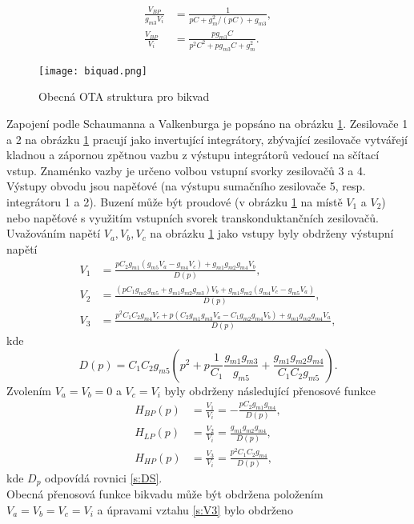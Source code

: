 \begin{align}
\frac{V_{BP}}{g_{m3}V_i} &= \frac{1}{pC + g_m^2/(pC) + g_{m3}},\\
\frac{V_{BP}}{V_i} &= \frac{pg_{m3}C}{p^2C^2 + pg_{m3}C + g_m^2}.
\end{align}
\begin{figure}[h]
\centering
\texttt{[image: biquad.png]}
\caption[Obecná OTA struktura pro bikvad]{Obecná OTA struktura pro bikvad \label{s:BIK}}
\end{figure}
\noindent Zapojení podle Schaumanna a Valkenburga \cite{13} je popsáno na obrázku \ref{s:BIK}. Zesilovače 1 a 2 na obrázku \ref{s:BIK} pracují jako invertující integrátory, zbývající zesilovače vytvářejí kladnou a zápornou zpětnou vazbu z výstupu integrátorů vedoucí na sčítací vstup. Znaménko vazby je určeno volbou vstupní svorky zesilovačů 3 a 4. Výstupy obvodu jsou napěťové (na výstupu sumačního zesilovače 5, resp. integrátoru 1 a 2). Buzení může být proudové (v obrázku \ref{s:BIK} na místě $V_1$ a $V_2$) nebo napěťové s využitím vstupních svorek transkonduktančních zesilovačů. Uvažováním napětí $V_a, V_b, V_c$ na obrázku \ref{s:BIK} jako vstupy byly obdrženy výstupní napětí
\begin{align}
V_1 &= \frac{pC_2g_{m1}(g_{m5}V_a - g_{m4}V_c) + g_{m1}g_{m2}g_{m4}V_b}{D(p)},\\
V_2 &= \frac{(pC_1g_{m2}g_{m5} + g_{m1}g_{m2}g_{m3})V_b + g_{m1}g_{m2}(g_{m4}V_c - g_{m5}V_a)}{D(p)},\\
V_3 &= \frac{p^2C_1C_2g_{m4}V_c + p(C_2g_{m1}g_{m3}V_a - C_1g_{m2}g_{m4}V_b) + g_{m1}g_{m2}g_{m4}V_a}{D(p)},
\end{align}\label{s:V3}
kde
\begin{equation}
D(p) = C_1C_2g_{m5}(p^2 + p\frac{1}{C_1}\frac{g_{m1}g_{m3}}{g_{m5}} + \frac{g_{m1}g_{m2}g_{m4}}{C_1C_2g_{m5}}).
\end{equation}\label{s:DS}
\noindent Zvolením $V_a = V_b = 0$ a $V_c = V_i$ byly obdrženy následující přenosové funkce
\begin{align}
H_{BP}(p) &= \frac{V_1}{V_i} = - \frac{pC_2g_{m1}g_{m4}}{D(p)},\\
H_{LP}(p) &= \frac{V_2}{V_i} = \frac{g_{m1}g_{m2}g_{m4}}{D(p)},\\
H_{HP}(p) &= \frac{V_3}{V_i} = \frac{p^2C_1C_2g_{m4}}{D(p)},
\end{align}
kde $D_p$ odpovídá rovnici \ref{s:DS}.\\
Obecná přenosová funkce bikvadu může být obdržena položením $V_a = V_b = V_c = V_i$ a úpravami vztahu \ref{s:V3} bylo obdrženo
